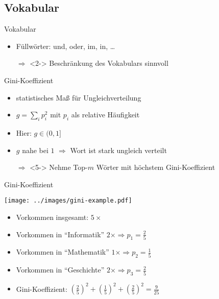 \subsection{Vokabular}
\begin{frame}{Vokabular}
    \begin{itemize}
        \item<1-> Füllwörter: und, oder, im, in, \dots
        \item[$\Rightarrow$]<2-> Beschränkung des Vokabulars sinnvoll
    \end{itemize}

\end{frame}

\begin{frame}{Gini-Koeffizient}
    \begin{itemize}
        \item<1-> statistisches Maß für Ungleichverteilung
        \item<2-> $g = \sum_i p_i^2$ mit $p_i$ als relative Häufigkeit
        \item<3-> Hier: $g \in (0, 1]$
        \item<4-> $g$ nahe bei $1$ $\Rightarrow$ Wort ist stark ungleich verteilt
        \item[$\Rightarrow$]<5-> Nehme Top-$m$ Wörter mit höchstem
                  Gini-Koeffizient
    \end{itemize}
\end{frame}

\begin{frame}{Gini-Koeffizient}
    \begin{center}
        \texttt{[image: ../images/gini-example.pdf]}
    \end{center}

    \begin{itemize}
        \item<3-> Vorkommen insgesamt: $5 \times$
        \item<4-> Vorkommen in \enquote{Informatik} $2\times \Rightarrow p_1 = \frac{2}{5}$
        \item<5-> Vorkommen in \enquote{Mathematik} $1\times \Rightarrow p_2 = \frac{1}{5}$
        \item<6-> Vorkommen in \enquote{Geschichte} $2\times \Rightarrow p_3 = \frac{2}{5}$
        \item<7-> Gini-Koeffizient: $\left (\frac{2}{5} \right )^2 + \left (\frac{1}{5} \right )^2 + \left (\frac{2}{5} \right )^2 = \frac{9}{25}$
    \end{itemize}
\end{frame}
